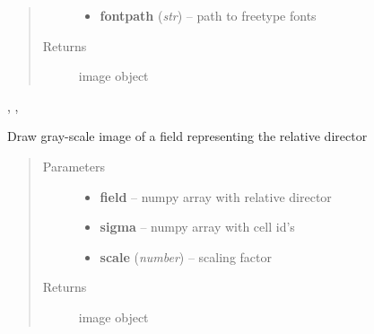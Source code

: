 \documentclass[letterpaper,10pt,english]{sphinxmanual}
\begin{document}
\begin{fulllineitems}
\begin{quote}
\begin{description}
\begin{itemize}
\item {} 
\textbf{fontpath} (\emph{str}) -- path to freetype fonts

\end{itemize}

\item[{Returns}] \leavevmode
image object

\end{description}\end{quote}




, ,     



\end{fulllineitems}


\begin{fulllineitems}
\label{ImageUtils:ImageUtils.drawRelDirField}
Draw gray-scale image of a field representing the relative director
\begin{quote}\begin{description}
\item[{Parameters}] \leavevmode\begin{itemize}
\item {} 
\textbf{field} -- numpy array with relative director

\item {} 
\textbf{sigma} -- numpy array with cell id's

\item {} 
\textbf{scale} (\emph{number}) -- scaling factor

\end{itemize}

\item[{Returns}] \leavevmode
image object

\end{description}\end{quote}

\end{fulllineitems}

\end{document}
